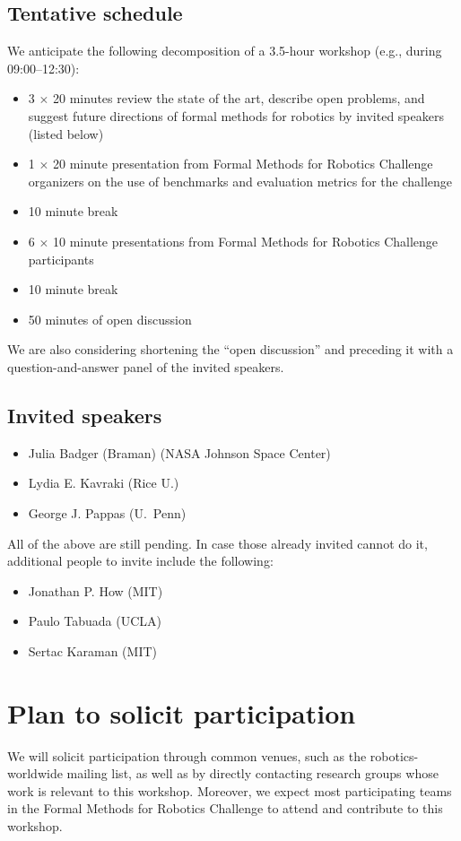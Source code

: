\documentclass{amsart}
\begin{document}
\subsection{Tentative schedule}
We anticipate the following decomposition of a 3.5-hour workshop (e.g., during 09:00--12:30):
\begin{itemize}
\item 3 $\times$ 20 minutes review the state of the art, describe open problems, and suggest future directions of formal methods for robotics by invited speakers (listed below)
\item 1 $\times$ 20 minute presentation from Formal Methods for Robotics Challenge organizers on the use of benchmarks and evaluation metrics for the challenge 
\item 10 minute break
\item 6 $\times$ 10 minute presentations from Formal Methods for Robotics Challenge participants
\item 10 minute break
\item 50 minutes of open discussion
\end{itemize}
We are also considering shortening the ``open discussion'' and preceding it
with a question-and-answer panel of the invited speakers.

\subsection{Invited speakers}
\begin{itemize}
\item Julia Badger (Braman) (NASA Johnson Space Center)
\item Lydia E. Kavraki (Rice U.)
\item George J. Pappas (U.~Penn)
\end{itemize}
All of the above are still pending.  In case those already invited cannot do it,
additional people to invite include the following:
\begin{itemize}
\item Jonathan P. How (MIT)
\item Paulo Tabuada (UCLA)
\item Sertac Karaman (MIT)
\end{itemize}

\section{Plan to solicit participation}
We will solicit participation through common venues, such as the
robotics-worldwide mailing list, as well as by directly contacting research
groups whose work is relevant to this workshop. Moreover, we expect most
participating teams in the Formal Methods for Robotics Challenge to attend and
contribute to this workshop.
\end{document}
